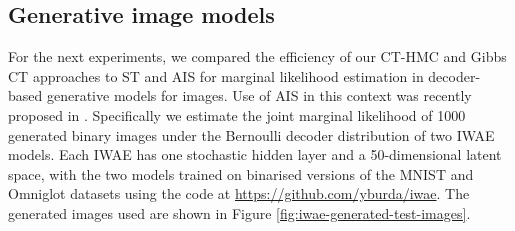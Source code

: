\subsection{Generative image models}\label{subsec:exp-iwae}

For the next experiments, we compared the efficiency of our \ac{CT-HMC} and Gibbs \ac{CT} approaches to \ac{ST} and \ac{AIS} for marginal likelihood estimation in decoder-based generative models for images. Use of \ac{AIS} in this context was recently proposed in \citep{wu2016quantitative}. Specifically we estimate the joint marginal likelihood of 1000 generated binary images under the Bernoulli decoder distribution of two \ac{IWAE} \citep{burda2016importance} models. Each \ac{IWAE} has one stochastic hidden layer and a 50-dimensional latent space, with the two models trained on binarised versions of the MNIST \citep{lecun1998gradient} and Omniglot \citep{lake2015human} datasets using the code at \url{https://github.com/yburda/iwae}. The generated images used are shown in Figure \ref{fig:iwae-generated-test-images}.

